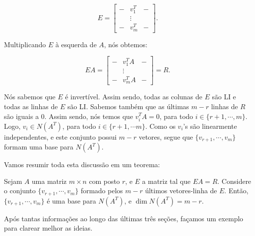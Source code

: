$$
E = \begin{bmatrix}
	- & v_1^T & - \\
	& \vdots & \\
	- & v_m^T & -
\end{bmatrix}.
$$

Multiplicando $E$ à esquerda de $A$, nós obtemos:

$$
EA = \begin{bmatrix}
	- & v_1^TA & - \\
	& \vdots & \\
	- & v_m^TA & -
\end{bmatrix} = R.
$$

Nós sabemos que $E$ é invertível. Assim sendo, todas as colunas de $E$ são LI e todas as linhas de $E$ são LI. Sabemos também que as últimas $m - r$ linhas de $R$ são iguais a $0$. Assim sendo, nós temos que $v_i^TA = 0$, para todo $i\in\{r + 1, \cdots, m\}$. Logo, $v_i\in N(A^T)$, para todo $i\in\{r + 1, \cdots m\}$. Como os $v_i$'s são linearmente independentes, e este conjunto possui $m - r$ vetores, segue que $\{v_{r + 1}, \cdots, v_m\}$ formam uma base para $N(A^T)$.

Vamos resumir toda esta discussão em um teorema:

\begin{Theorem}
	Sejam $A$ uma matriz $m\times n$ com posto $r$, e $E$ a matriz tal que $EA = R$. Considere o conjunto $\{v_{r + 1}, \cdots, v_m\}$ formado pelos $m - r$ últimos vetores-linha de $E$. Então, $\{v_{r + 1}, \cdots, v_m\}$ é uma base para $N(A^T)$, e $\dim N(A^T) = m - r$.
\end{Theorem}

Após tantas informações ao longo das últimas três seções, façamos um exemplo para clarear melhor as ideias.

